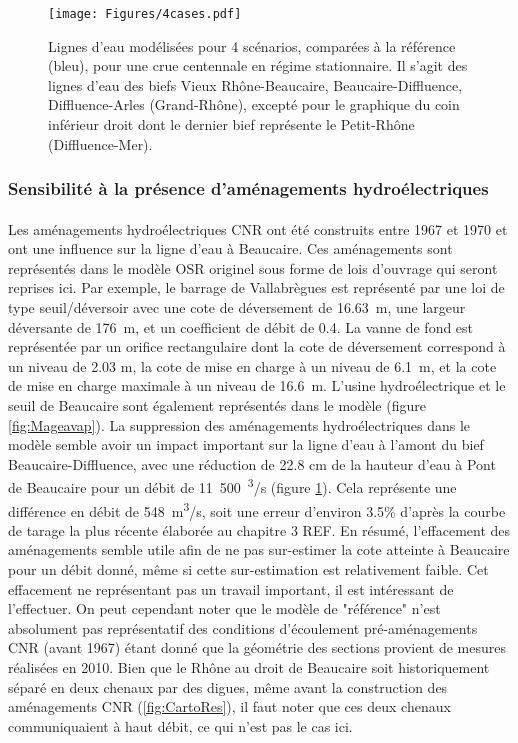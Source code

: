 \documentclass[11pt]{article}
\begin{document}
	\begin{figure}[h]
		\centering
		\texttt{[image: Figures/4cases.pdf]}
        \caption{Lignes d'eau modélisées pour 4 scénarios, comparées à la référence (bleu), pour une crue centennale en régime stationnaire. Il s'agit des lignes d'eau des biefs Vieux Rhône-Beaucaire, Beaucaire-Diffluence, Diffluence-Arles (Grand-Rhône), excepté pour le graphique du coin inférieur droit dont le dernier bief représente le Petit-Rhône (Diffluence-Mer).}
		\label{fig:Sensib4}
	\end{figure}		
				
\FloatBarrier	

	\subsubsection{Sensibilité à la présence d'aménagements hydroélectriques}
	
		\paragraph{} Les aménagements hydroélectriques CNR ont été construits entre 1967 et 1970 et ont une influence sur la ligne d'eau à Beaucaire. Ces aménagements sont représentés dans le modèle OSR originel \citep{launay_zabr-osr_2017} sous forme de lois d'ouvrage qui seront reprises ici. Par exemple, le barrage de Vallabrègues est représenté par une loi de type seuil/déversoir avec une cote de déversement de 16.63~m, une largeur déversante de 176~m, et un coefficient de débit de 0.4. La vanne de fond est représentée par un orifice rectangulaire dont la cote de déversement correspond à un niveau de 2.03 m, la cote de mise en charge à un niveau de 6.1~m, et la cote de mise en charge maximale à un niveau de 16.6~m. L'usine hydroélectrique et le seuil de Beaucaire sont également représentés dans le modèle (figure \ref{fig:Mageavap}). La suppression des aménagements hydroélectriques dans le modèle semble avoir un impact important sur la ligne d'eau à l'amont du bief Beaucaire-Diffluence, avec une réduction de 22.8 cm de la hauteur d'eau à Pont de Beaucaire pour un débit de 11~500~\textsuperscript{3}/s (figure \ref{fig:Sensib4}). Cela représente une différence en débit de 548~m\textsuperscript{3}/s, soit une erreur d'environ 3.5\% d'après la courbe de tarage la plus récente élaborée au chapitre 3 REF. En résumé, l'effacement des aménagements semble utile afin de ne pas sur-estimer la cote atteinte à Beaucaire pour un débit donné, même si cette sur-estimation est relativement faible. Cet effacement ne représentant pas un travail important, il est intéressant de l'effectuer. On peut cependant noter que le modèle de "référence" n'est absolument pas représentatif des conditions d'écoulement pré-aménagements CNR (avant 1967) étant donné que la géométrie des sections provient de mesures réalisées en 2010. Bien que le Rhône au droit de Beaucaire soit historiquement séparé en deux chenaux par des digues, même avant la construction des aménagements CNR (\ref{fig:CartoRes}), il faut noter que ces deux chenaux communiquaient à haut débit, ce qui n'est pas le cas ici. 
		
\end{document}
